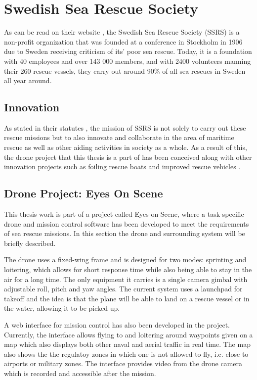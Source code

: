 \documentclass[nofilelist]{cslthse-msc}
\begin{document}
\section{Swedish Sea Rescue Society}
As can be read on their website \cite{ssrs}, the Swedish Sea Rescue Society (SSRS) is a non-profit organization that was founded at a conference in Stockholm in 1906 due to Sweden receiving criticism of its' poor sea rescue. Today, it is a foundation with 40 employees and over 143 000 members, and with 2400 volunteers manning their 260 rescue vessels, they carry out around 90\% of all sea rescues in Sweden all year around.

\subsection{Innovation}
As stated in their statutes \cite{ssrs-statues}, the mission of SSRS is not solely to carry out these rescue missions but to also innovate and collaborate in the area of maritime rescue as well as other aiding activities in society as a whole. As a result of this, the drone project that this thesis is a part of has been conceived along with other innovation projects such as foiling rescue boats and improved rescue vehicles \cite{surtsey-innovation}.

\subsection{Drone Project: Eyes On Scene}
This thesis work is part of a project called Eyes-on-Scene, where a task-specific drone and mission control software has been developed to meet the requirements of sea rescue missions. In this section the drone and surrounding system will be briefly described.

The drone uses a fixed-wing frame and is designed for two modes: sprinting and loitering, which allows for short response time while also being able to stay in the air for a long time. The only equipment it carries is a single camera gimbal with adjustable roll, pitch and yaw angles. The current system uses a launchpad for takeoff and the idea is that the plane will be able to land on a rescue vessel or in the water, allowing it to be picked up. 

A web interface for mission control has also been developed in the project. Currently, the interface allows flying to and loitering around waypoints given on a map which also displays both other naval and aerial traffic in real time. The map also shows the the regulatoy zones in which one is not allowed to fly, i.e. close to airports or military zones. The interface provides video from the drone camera which is recorded and accessible after the mission.
\end{document}
